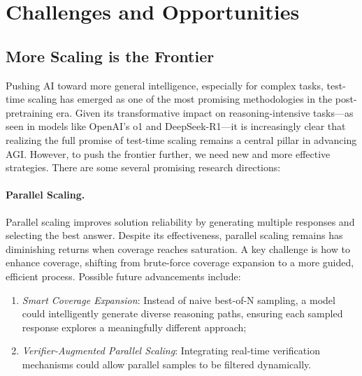 \section{Challenges and Opportunities}
\label{sec:challenges}

\subsection{More Scaling is the Frontier}
\label{subsec:frontier}
Pushing AI toward more general intelligence, especially for complex tasks, test-time scaling has emerged as one of the most promising methodologies in the post-pretraining era. Given its transformative impact on reasoning-intensive tasks—as seen in models like OpenAI’s o1 and DeepSeek-R1—it is increasingly clear that realizing the full promise of test-time scaling remains a central pillar in advancing AGI. 
However, to push the frontier further, we need new and more effective strategies. There are some several promising research directions:

\paragraph{Parallel Scaling.} Parallel scaling improves solution reliability by generating multiple responses and selecting the best answer. Despite its effectiveness, parallel scaling remains has diminishing returns when coverage reaches saturation. A key challenge is how to enhance coverage, shifting from brute-force coverage expansion to a more guided, efficient process. Possible future advancements include: 
\begin{enumerate}
    \item \textit{Smart Coverage Expansion}: Instead of naive best-of-N sampling, a model could intelligently generate diverse reasoning paths, ensuring each sampled response explores a meaningfully different approach; 
    \item \textit{Verifier-Augmented Parallel Scaling}: Integrating real-time verification mechanisms could allow parallel samples to be filtered dynamically.
\end{enumerate}

